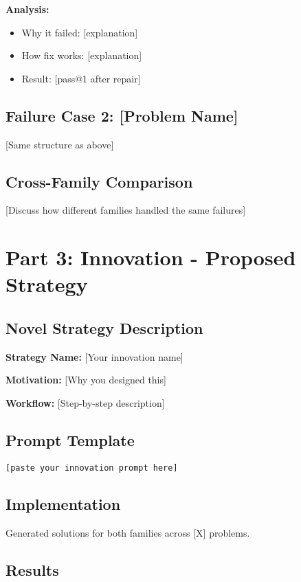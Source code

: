 \documentclass[11pt]{article}
\begin{document}
\textbf{Analysis:}
\begin{itemize}
    \item Why it failed: [explanation]
    \item How fix works: [explanation]
    \item Result: [pass@1 after repair]
\end{itemize}

\subsection{Failure Case 2: [Problem Name]}

[Same structure as above]

\subsection{Cross-Family Comparison}

[Discuss how different families handled the same failures]

\newpage
\section{Part 3: Innovation - Proposed Strategy}

\subsection{Novel Strategy Description}

\textbf{Strategy Name:} [Your innovation name]

\textbf{Motivation:} [Why you designed this]

\textbf{Workflow:} [Step-by-step description]

\subsection{Prompt Template}

\begin{lstlisting}
[paste your innovation prompt here]
\end{lstlisting}

\subsection{Implementation}

Generated solutions for both families across [X] problems.

\subsection{Results}
\end{document}
